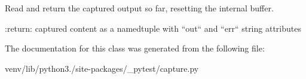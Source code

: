 \begin{DoxyVerb}Read and return the captured output so far, resetting the internal buffer.

:return: captured content as a namedtuple with  ``out`` and ``err`` string attributes
\end{DoxyVerb}
 

The documentation for this class was generated from the following file\+:\begin{DoxyCompactItemize}
\item 
venv/lib/python3./site-\/packages/\+\_\+pytest/capture.\+py\end{DoxyCompactItemize}
